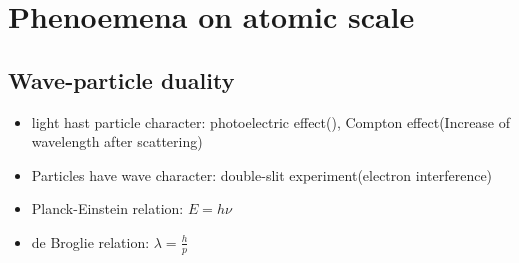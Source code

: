 \section{Phenoemena on atomic scale}
\subsection{Wave-particle duality}
\begin{itemize}
    \item light hast particle character: photoelectric effect(), Compton effect(Increase of wavelength after scattering)
    \item Particles have wave character: double-slit experiment(electron interference)
    \item Planck-Einstein relation: $E = h \nu$
    \item de Broglie relation: $\lambda = \frac{h}{p}$
\end{itemize}








